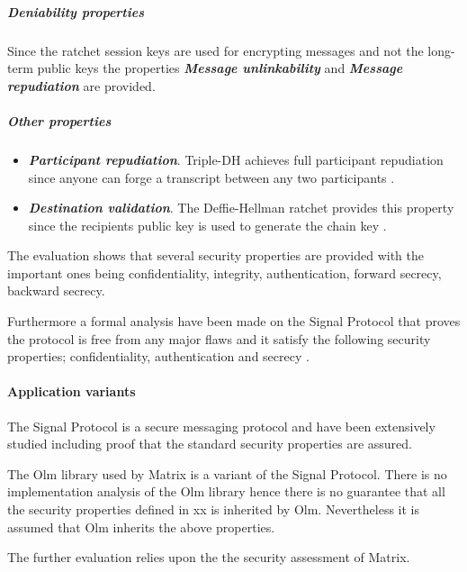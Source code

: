 \subparagraph{Deniability properties}

Since the ratchet session keys are used for encrypting messages and not the long-term public keys the properties \textbf{\emph{Message unlinkability}} and \textbf{\emph{Message repudiation}} are provided. 


\subparagraph{Other properties}

\begin{itemize}
	\item \textbf{\emph{Participant repudiation}}. Triple-DH achieves full participant repudiation since anyone can forge a transcript between any two participants \cite{sok}.
	\item \textbf{\emph{Destination validation}}. The Deffie-Hellman ratchet provides this property since the recipients public key is used to generate the chain key \cite{sok}. %
\end{itemize}


The evaluation shows that several security properties are provided with the important ones being confidentiality, integrity, authentication, forward secrecy, backward secrecy. 

Furthermore a formal analysis have been made on the Signal Protocol that proves the protocol is free from any major flaws and it satisfy the following security properties; confidentiality, authentication and secrecy \cite{Signal}. 

\paragraph{Application variants}

The Signal Protocol is a secure messaging protocol and have been extensively studied including proof that the standard security properties are assured. 

The Olm library used by Matrix is a variant of the Signal Protocol. There is no implementation analysis of the Olm library hence there is no guarantee that all the security properties defined in xx is inherited by Olm. Nevertheless it is assumed that Olm inherits the above properties.

The further evaluation relies upon the the security assessment of Matrix. 



